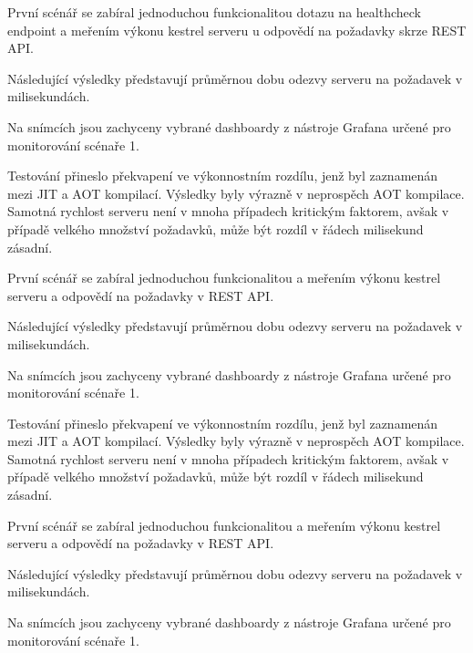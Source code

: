 

První scénář se zabíral jednoduchou funkcionalitou dotazu na healthcheck endpoint a meřením výkonu kestrel serveru u odpovědí na požadavky skrze REST API.


Následující výsledky představují průměrnou dobu odezvy serveru na požadavek v milisekundách. 

Na snímcích jsou zachyceny vybrané dashboardy z nástroje Grafana určené pro monitorování scénaře 1. 


Testování přineslo překvapení ve výkonnostním rozdílu, jenž byl zaznamenán mezi JIT a AOT kompilací. Výsledky byly výrazně v neprospěch AOT kompilace. Samotná rychlost serveru není v mnoha případech kritickým faktorem, avšak v případě velkého množství požadavků, může být rozdíl v řádech milisekund zásadní.


První scénář se zabíral jednoduchou funkcionalitou a meřením výkonu kestrel serveru a odpovědí na požadavky v REST API.


Následující výsledky představují průměrnou dobu odezvy serveru na požadavek v milisekundách. 

Na snímcích jsou zachyceny vybrané dashboardy z nástroje Grafana určené pro monitorování scénaře 1. 


Testování přineslo překvapení ve výkonnostním rozdílu, jenž byl zaznamenán mezi JIT a AOT kompilací. Výsledky byly výrazně v neprospěch AOT kompilace. Samotná rychlost serveru není v mnoha případech kritickým faktorem, avšak v případě velkého množství požadavků, může být rozdíl v řádech milisekund zásadní.


První scénář se zabíral jednoduchou funkcionalitou a meřením výkonu kestrel serveru a odpovědí na požadavky v REST API.


Následující výsledky představují průměrnou dobu odezvy serveru na požadavek v milisekundách. 

Na snímcích jsou zachyceny vybrané dashboardy z nástroje Grafana určené pro monitorování scénaře 1. 


